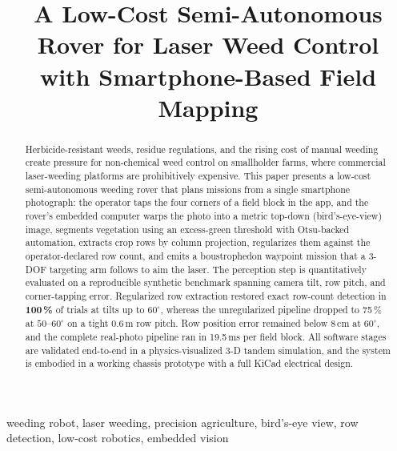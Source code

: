 \documentclass[conference]{IEEEtran}
\begin{document}
\title{A Low-Cost Semi-Autonomous Rover for Laser Weed Control\\
with Smartphone-Based Field Mapping}

\author{
}

\maketitle

\begin{abstract}
 Herbicide-resistant weeds, residue regulations, and the rising cost of manual
 weeding create pressure for non-chemical weed control on smallholder farms,
 where commercial laser-weeding platforms are prohibitively expensive. This
 paper presents a low-cost semi-autonomous weeding rover that plans missions
 from a single smartphone photograph: the operator taps the four corners of a
 field block in the app, and the rover's embedded computer warps the photo into
 a metric top-down (bird's-eye-view) image, segments vegetation using an
 excess-green threshold with Otsu-backed automation, extracts crop rows by
 column projection, regularizes them against the operator-declared row count,
 and emits a boustrophedon waypoint mission that a 3-DOF targeting arm follows
 to aim the laser. The perception step is quantitatively evaluated on a
 reproducible synthetic benchmark spanning camera tilt, row pitch, and
 corner-tapping error. Regularized row extraction restored exact row-count
 detection in \textbf{100\,\%} of trials at tilts up to $60^\circ$, whereas the
 unregularized pipeline dropped to 75\,\% at $50$--$60^\circ$ on a tight
 0.6\,m row pitch. Row position error remained below 8\,cm at $60^\circ$, and
 the complete real-photo pipeline ran in 19.5\,ms per field block. All
 software stages are validated end-to-end in a physics-visualized 3-D tandem
 simulation, and the system is embodied in a working chassis prototype with a
 full KiCad electrical design.
\end{abstract}

\begin{IEEEkeywords}
 weeding robot, laser weeding, precision agriculture, bird's-eye view,
 row detection, low-cost robotics, embedded vision
\end{IEEEkeywords}
\end{document}
